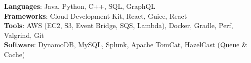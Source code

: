 \begin{center}
\textbf{Languages}: Java, Python, C++, SQL, GraphQL\\
\textbf{Frameworks}: Cloud Development Kit, React, Guice, React\\
\textbf{Tools}: AWS (EC2, S3, Event Bridge, SQS, Lambda), Docker, Gradle, Perf, Valgrind, Git\\
\textbf{Software}: DynamoDB, MySQL, Splunk, Apache TomCat, HazelCast (Queue \& Cache)
\end{center}